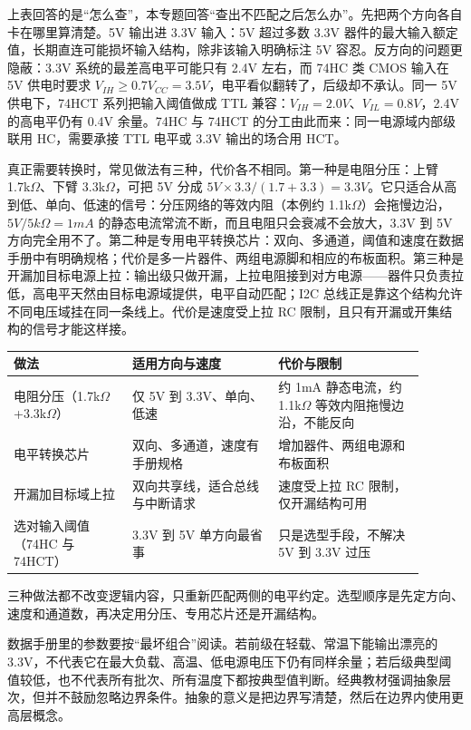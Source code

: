 上表回答的是“怎么查”，本专题回答“查出不匹配之后怎么办”。先把两个方向各自卡在哪里算清楚。5V 输出进 3.3V 输入：5V 超过多数 3.3V 器件的最大输入额定值，长期直连可能损坏输入结构，除非该输入明确标注 5V 容忍。反方向的问题更隐蔽：3.3V 系统的最差高电平可能只有 2.4V 左右，而 74HC 类 CMOS 输入在 5V 供电时要求 $V_{IH} \ge 0.7V_{CC} = 3.5V$，电平看似翻转了，后级却不承认。同一 5V 供电下，74HCT 系列把输入阈值做成 TTL 兼容：$V_{IH}=2.0V$、$V_{IL}=0.8V$，2.4V 的高电平仍有 0.4V 余量。74HC 与 74HCT 的分工由此而来：同一电源域内部级联用 HC，需要承接 TTL 电平或 3.3V 输出的场合用 HCT。

真正需要转换时，常见做法有三种，代价各不相同。第一种是电阻分压：上臂 1.7k$\Omega$、下臂 3.3k$\Omega$，可把 5V 分成 $5V \times 3.3/(1.7+3.3) = 3.3V$。它只适合从高到低、单向、低速的信号：分压网络的等效内阻（本例约 1.1k$\Omega$）会拖慢边沿，$5V/5k\Omega=1mA$ 的静态电流常流不断，而且电阻只会衰减不会放大，3.3V 到 5V 方向完全用不了。第二种是专用电平转换芯片：双向、多通道，阈值和速度在数据手册中有明确规格；代价是多一片器件、两组电源脚和相应的布板面积。第三种是开漏加目标电源上拉：输出级只做开漏，上拉电阻接到对方电源——器件只负责拉低，高电平天然由目标电源域提供，电平自动匹配；I2C 总线正是靠这个结构允许不同电压域挂在同一条线上。代价是速度受上拉 RC 限制，且只有开漏或开集结构的信号才能这样接。

\begin{longtable}{L{0.26\linewidth}L{0.32\linewidth}L{0.32\linewidth}}
\toprule
做法 & 适用方向与速度 & 代价与限制 \\
\midrule
电阻分压（1.7k$\Omega$+3.3k$\Omega$） & 仅 5V 到 3.3V、单向、低速 & 约 1mA 静态电流，约 1.1k$\Omega$ 等效内阻拖慢边沿，不能反向 \\\tablerowrule
电平转换芯片 & 双向、多通道，速度有手册规格 & 增加器件、两组电源和布板面积 \\\tablerowrule
开漏加目标域上拉 & 双向共享线，适合总线与中断请求 & 速度受上拉 RC 限制，仅开漏结构可用 \\\tablerowrule
选对输入阈值（74HC 与 74HCT） & 3.3V 到 5V 单方向最省事 & 只是选型手段，不解决 5V 到 3.3V 过压 \\
\bottomrule
\end{longtable}

三种做法都不改变逻辑内容，只重新匹配两侧的电平约定。选型顺序是先定方向、速度和通道数，再决定用分压、专用芯片还是开漏结构。

数据手册里的参数要按“最坏组合”阅读。若前级在轻载、常温下能输出漂亮的 3.3V，不代表它在最大负载、高温、低电源电压下仍有同样余量；若后级典型阈值较低，也不代表所有批次、所有温度下都按典型值判断。经典教材强调抽象层次，但并不鼓励忽略边界条件。抽象的意义是把边界写清楚，然后在边界内使用更高层概念。

